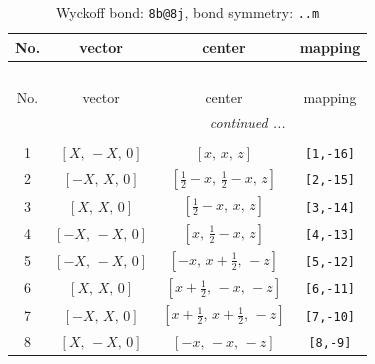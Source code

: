 \documentclass[fleqn,8pt]{jsarticle}
\begin{document}
\begin{longtable}{cccc}
\caption{Wyckoff bond: {\tt 8b@8j}, bond symmetry: {\tt ..m}}
 \\
 \hline \hline
No. & vector & center & mapping \\ \hline \endfirsthead

\multicolumn{3}{l}{\tablename\ \thetable{}} \\
 \hline \hline
No. & vector & center & mapping \\ \hline \endhead

 \hline \hline
\multicolumn{3}{r}{\footnotesize\it continued ...} \\ \endfoot

 \hline \hline
\multicolumn{3}{r}{} \\ \endlastfoot

1 & $\left[ X,\, - X,\, 0 \right]$ & $\left[ x,\, x,\, z \right]$ & {\tt [1,-16]} \\ \hline
2 & $\left[ - X,\, X,\, 0 \right]$ & $\left[ \frac{1}{2} - x,\, \frac{1}{2} - x,\, z \right]$ & {\tt [2,-15]} \\ \hline
3 & $\left[ X,\, X,\, 0 \right]$ & $\left[ \frac{1}{2} - x,\, x,\, z \right]$ & {\tt [3,-14]} \\ \hline
4 & $\left[ - X,\, - X,\, 0 \right]$ & $\left[ x,\, \frac{1}{2} - x,\, z \right]$ & {\tt [4,-13]} \\ \hline
5 & $\left[ - X,\, - X,\, 0 \right]$ & $\left[ - x,\, x + \frac{1}{2},\, - z \right]$ & {\tt [5,-12]} \\ \hline
6 & $\left[ X,\, X,\, 0 \right]$ & $\left[ x + \frac{1}{2},\, - x,\, - z \right]$ & {\tt [6,-11]} \\ \hline
7 & $\left[ - X,\, X,\, 0 \right]$ & $\left[ x + \frac{1}{2},\, x + \frac{1}{2},\, - z \right]$ & {\tt [7,-10]} \\ \hline
8 & $\left[ X,\, - X,\, 0 \right]$ & $\left[ - x,\, - x,\, - z \right]$ & {\tt [8,-9]} \\
\end{longtable}
\renewcommand{\arraystretch}{1.2}
\end{document}
